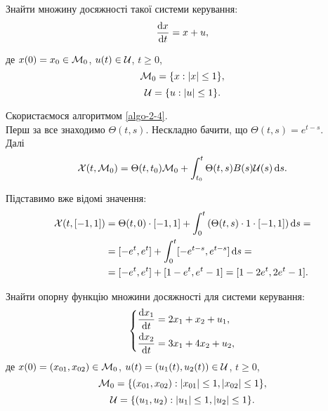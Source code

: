 \begin{problem}
	Знайти множину досяжності такої системи керування: \[ \frac{\mathop{}\!\mathrm{d} x}{\mathop{}\!\mathrm{d} t} = x + u, \]

	де $x (0) = x_0 \in \mathcal{M}_0$, $u (t) \in \mathcal{U}$, $t \ge 0$, \[ \mathcal{M}_0 = \{ x: |x| \le 1 \}, \] \[ \mathcal{U} = \{ u: |u| \le 1 \}. \]
\end{problem}

\begin{solution}
	Скористаємося алгоритмом \ref{algo-2-4}. \\

	Перш за все знаходимо $\Theta(t,s)$. Нескладно бачити, що $\Theta(t, s) = e^{t - s}$. \\

	Далі \[ \mathcal{X}(t, \mathcal{M}_0) = \Theta(t, t_0) \mathcal{M}_0 + \int_{t_0}^t \Theta(t, s) B(s) \mathcal{U}(s) \mathop{}\!\mathrm{d} s. \]

	Підставимо вже відомі значення: 
	\begin{align*} 
		\mathcal{X}(t, [-1, 1]) &= \Theta(t, 0) \cdot [-1, 1] + \int_0^t \left( \Theta(t, s) \cdot 1 \cdot [-1, 1] \right) \mathop{}\!\mathrm{d} s = \\
		&= [-e^t, e^t] + \int_0^t [-e^{t - s}, e^{t - s}] \mathop{}\!\mathrm{d} s = \\ 
		&= [-e^t, e^t] + [1 - e^t, e^t - 1] = [1 - 2 e^t, 2 e^t - 1]. 
	\end{align*}
\end{solution}

\begin{problem}
	Знайти опорну функцію множини досяжності для системи керування: \[
	\left\{
		\begin{aligned}
			\frac{\mathop{}\!\mathrm{d} x_1}{\mathop{}\!\mathrm{d} t} &= 2x_1 + x_2 + u_1, \\
			\frac{\mathop{}\!\mathrm{d} x_2}{\mathop{}\!\mathrm{d} t} &= 3x_1 + 4x_2 + u_2,
		\end{aligned}
	\right.
	\]
	де $x (0) = (x_{01}, x_{02}) \in \mathcal{M}_0$, $u(t) = (u_1(t), u_2(t)) \in \mathcal{U}$, $t \ge 0$, \[ \mathcal{M}_0 = \{ (x_{01}, x_{02}): |x_{01}| \le 1, |x_{02}| \le 1 \}, \] \[ \mathcal{U} = \{(u_1, u_2): |u_1| \le 1, |u_2| \le 1\}. \]
\end{problem}

